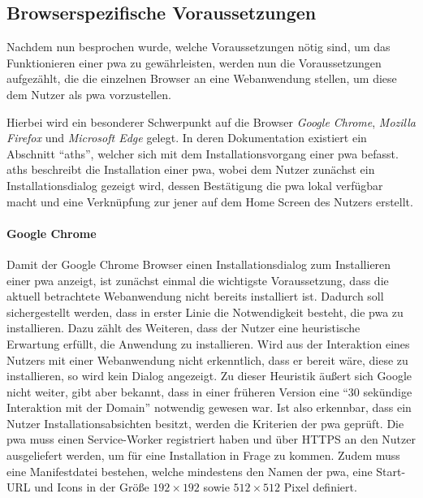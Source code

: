 \documentclass[12pt, parskip=half]{scrartcl}       %
\begin{document}

\subsection{Browserspezifische Voraussetzungen}

Nachdem nun besprochen wurde, welche Voraussetzungen nötig sind, um das Funktionieren einer \ac{pwa} zu gewährleisten, werden nun die Voraussetzungen aufgezählt, die die einzelnen Browser an eine Webanwendung stellen, um diese dem Nutzer als \ac{pwa} vorzustellen.

Hierbei wird ein besonderer Schwerpunkt auf die Browser \textit{Google Chrome}, \textit{Mozilla Firefox} und \textit{Microsoft Edge} gelegt.
In deren Dokumentation\cite{googledev_pwainstallcriteria,docsmicrosoft_pwainstallcriteria,mozilladev_pwainstallcriteria} existiert ein Abschnitt \enquote{\ac{aths}}, welcher sich mit dem Installationsvorgang einer \ac{pwa} befasst.
\ac{aths} beschreibt die Installation einer \ac{pwa}, wobei dem Nutzer zunächst ein Installationsdialog gezeigt wird, dessen Bestätigung die \ac{pwa} lokal verfügbar macht und eine Verknüpfung zur jener auf dem Home Screen des Nutzers erstellt.


\paragraph{Google Chrome}
Damit der Google Chrome Browser einen Installationsdialog zum Installieren einer \ac{pwa} anzeigt, ist zunächst einmal die wichtigste Voraussetzung, dass die aktuell betrachtete Webanwendung nicht bereits installiert ist.
Dadurch soll sichergestellt werden, dass in erster Linie die Notwendigkeit besteht, die \ac{pwa} zu installieren.
Dazu zählt des Weiteren, dass der Nutzer eine heuristische Erwartung erfüllt, die Anwendung zu installieren.
Wird aus der Interaktion eines Nutzers mit einer Webanwendung nicht erkenntlich, dass er bereit wäre, diese zu installieren, so wird kein Dialog angezeigt.
Zu dieser Heuristik äußert sich Google nicht weiter, gibt aber bekannt, dass in einer früheren Version eine \enquote{30 sekündige Interaktion mit der Domain} notwendig gewesen war.
Ist also erkennbar, dass ein Nutzer Installationsabsichten besitzt, werden die Kriterien der \ac{pwa} geprüft.
Die \ac{pwa} muss einen Service-Worker registriert haben und über HTTPS an den Nutzer ausgeliefert werden, um für eine Installation in Frage zu kommen.
Zudem muss eine Manifestdatei bestehen, welche mindestens den Namen der \ac{pwa}, eine Start-URL und Icons in der Größe $192\times192$ sowie $512\times512$ Pixel definiert.
\end{document}
